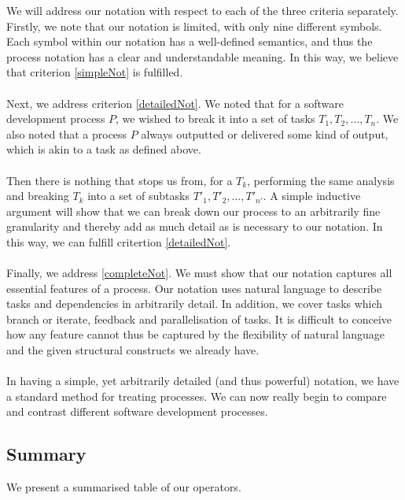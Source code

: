 We will address our notation with respect to each of the three criteria separately.
Firstly, we note that our notation is limited, with only nine different symbols.
Each symbol within our notation has a well-defined semantics, and thus the process notation has a
clear and understandable meaning.
In this way, we believe that criterion \ref{simpleNot} is fulfilled.\\
\\
Next, we address criterion \ref{detailedNot}.
We noted that for a software development process $P$, we wished to break it into a set of tasks
$T_1, T_2, \ldots, T_n$.
We also noted that a process $P$ always outputted or delivered some kind of output, which is akin to
a task as defined above.\\
\\
Then there is nothing that stops us from, for a $T_k$, performing the same analysis and breaking
$T_k$ into a set of subtasks $T'_1, T'_2, \ldots, T'_{n'}$.
A simple inductive argument will show that we can break down our process to an arbitrarily fine
granularity and thereby add as much detail as is necessary to our notation.
In this way, we can fulfill critertion \ref{detailedNot}.\\
\\
Finally, we address \ref{completeNot}.
We must show that our notation captures all essential features of a process.
Our notation uses natural language to describe tasks and dependencies in arbitrarily detail.
In addition, we cover tasks which branch or iterate, feedback and parallelisation of tasks.
It is difficult to conceive how any feature cannot thus be captured by the flexibility of natural
language and the given structural constructs we already have.\\
\\
In having a simple, yet arbitrarily detailed (and thus powerful) notation, we have a standard method
for treating processes.
We can now really begin to compare and contrast different software development processes.

\subsection{Summary}

We present a summarised table of our operators.

\begin{table}

\end{table}
